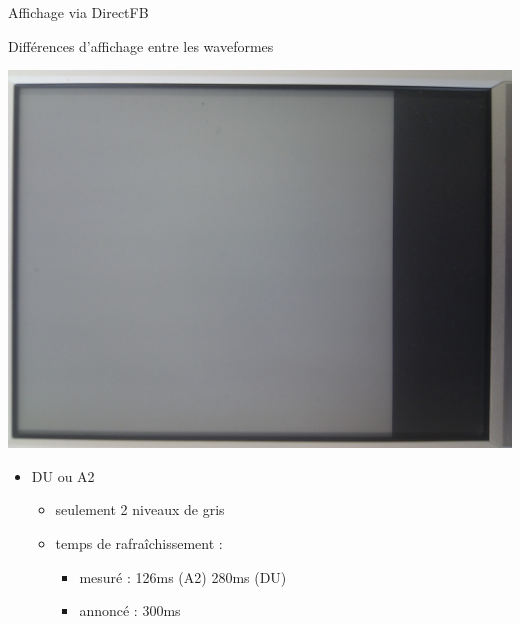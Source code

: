\begin{frame}{ Affichage via DirectFB }
	\begin{block} { Différences d'affichage entre les waveformes }
		\parbox{0.3\linewidth}{
			\includegraphics[angle=-90,origin=c,scale=0.04]{du_a2.jpg}
		}
		\parbox{0.6\linewidth}{
			\begin{itemize}
				\item DU ou A2
				\begin{itemize}
					\item seulement 2 niveaux de gris
					\item temps de rafraîchissement : 
					\begin{itemize}
						\item mesuré  : 126ms (A2) 280ms (DU)
						\item annoncé  : 300ms
					\end{itemize}		
				\end{itemize}
			\end{itemize}
		}
	\end{block}
\end{frame}